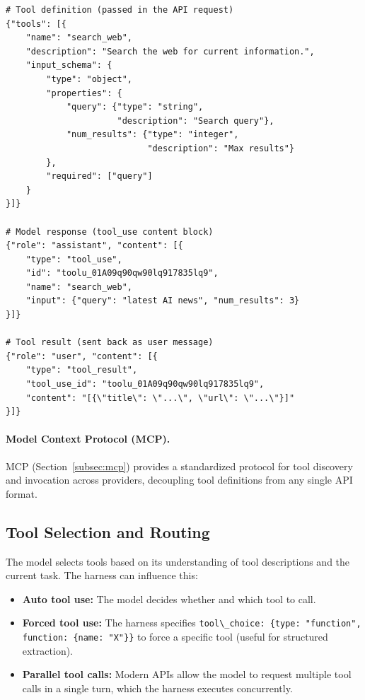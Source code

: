 \begin{examplebox}
\begin{lstlisting}[style=pythonstyle]
# Tool definition (passed in the API request)
{"tools": [{
    "name": "search_web",
    "description": "Search the web for current information.",
    "input_schema": {
        "type": "object",
        "properties": {
            "query": {"type": "string",
                      "description": "Search query"},
            "num_results": {"type": "integer",
                            "description": "Max results"}
        },
        "required": ["query"]
    }
}]}

# Model response (tool_use content block)
{"role": "assistant", "content": [{
    "type": "tool_use",
    "id": "toolu_01A09q90qw90lq917835lq9",
    "name": "search_web",
    "input": {"query": "latest AI news", "num_results": 3}
}]}

# Tool result (sent back as user message)
{"role": "user", "content": [{
    "type": "tool_result",
    "tool_use_id": "toolu_01A09q90qw90lq917835lq9",
    "content": "[{\"title\": \"...\", \"url\": \"...\"}]"
}]}
\end{lstlisting}
\end{examplebox}

\paragraph{Model Context Protocol (MCP).}
\label{model-context-protocol-mcp.}

MCP (Section~\ref{subsec:mcp}) provides a standardized protocol for tool discovery and invocation across providers, decoupling tool definitions from any single API format.

\subsection{Tool Selection and Routing}
\label{tool-selection-and-routing}

The model selects tools based on its understanding of tool descriptions and the current task. The harness can influence this:

\begin{itemize}
  \item \textbf{Auto tool use:} The model decides whether and which tool to call.
  \item \textbf{Forced tool use:} The harness specifies \verb|tool\_choice: {type: "function", function: {name: "X"}}| to force a specific tool (useful for structured extraction).
  \item \textbf{Parallel tool calls:} Modern APIs allow the model to request multiple tool calls in a single turn, which the harness executes concurrently.
\end{itemize}

